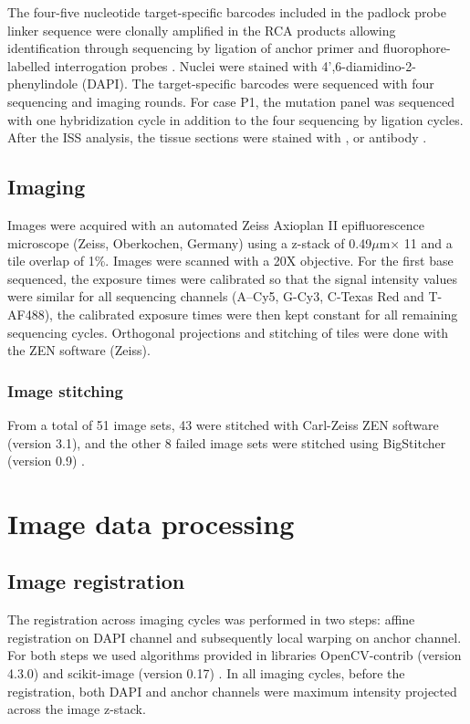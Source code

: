 The four-five nucleotide target-specific barcodes included in the padlock probe linker sequence were clonally amplified in the RCA products allowing identification through sequencing by ligation of anchor primer and fluorophore-labelled interrogation probes \parencite{Ke2013-ux}. Nuclei were stained with 4',6-diamidino-2-phenylindole (DAPI). The target-specific barcodes were sequenced with four sequencing and imaging rounds. For case P1, the mutation panel was sequenced with one hybridization cycle in addition to the four sequencing by ligation cycles. After the \ac{ISS} analysis, the tissue sections were stained with ,  or  antibody .

\subsection{Imaging}

Images were acquired with an automated Zeiss Axioplan II epifluorescence microscope (Zeiss, Oberkochen, Germany) using a z-stack of 0.49$\mu$m$ \times$ 11 and a tile overlap of 1\%. Images were scanned with a 20X objective. For the first base sequenced, the exposure times were calibrated so that the signal intensity values were similar for all sequencing channels (A–Cy5, G-Cy3, C-Texas Red and T-AF488), the calibrated exposure times were then kept constant for all remaining sequencing cycles. Orthogonal projections and stitching of tiles were done with the ZEN software (Zeiss).

\subsubsection*{Image stitching}

From a total of 51 image sets, 43 were stitched with Carl-Zeiss ZEN software (version 3.1), and the other 8 failed image sets were stitched using BigStitcher (version 0.9) \parencite{Horl2019-hy}.

\section{Image data processing}
\label{sec:protocol-suppl-image-processing}

\subsection{Image registration}

The registration across imaging cycles was performed in two steps: affine registration on DAPI channel and subsequently local warping on anchor channel. For both steps we used algorithms provided in libraries OpenCV-contrib (version 4.3.0) \parencite{Bradski2000-sm} and scikit-image (version 0.17) \parencite{Van_der_Walt2014-pj}. In all imaging cycles, before the registration, both DAPI and anchor channels were maximum intensity projected across the image z-stack.

